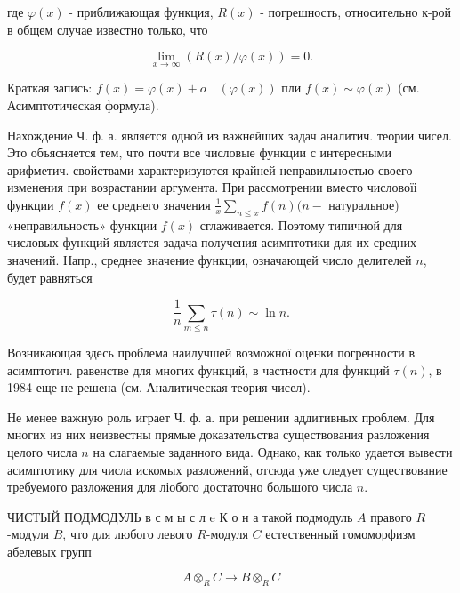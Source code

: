 \documentclass[10pt]{article}
\begin{document}
где $\varphi(x)$ - приближающая функция, $R(x)$ - погрешность, относительно к-рой в общем случае известно только, что



\[

\lim _{x \rightarrow \infty}(R(x) / \varphi(x))=0 .

\]



Краткая запись: $f(x)=\varphi(x)+o \quad(\varphi(x))$ пли $f(x) \sim \varphi(x)$ (см. Асимптотическая формула).



Нахождение Ч. ф. а. является одной из важнейших задач аналитич. теории чисел. Это объясняется тем, что почти все числовые функции с интересными арифметич. свойствами характеризуются крайней неправильностью своего изменения при возрастании аргумента. При рассмотрении вместо числовоїі функции $f(x)$ ее среднего значения $\frac{1}{x} \sum_{n \leqslant x} f(n)(n-$ натуральное) «неправильность» функции $f(x)$ сглаживается. Поэтому типичной для числовых функций является задача получения асимптотики для их средних значений. Напр., среднее значение функции, означающей число делителей $n$, будет равняться



\[

\frac{1}{n} \sum_{m \leqslant n} \tau(n) \sim \ln n .

\]



Возникающая здесь проблема наилучшей возможної оценки погренности в асимптотич. равенстве для многих функций, в частности для функций $\tau(n)$, в 1984 еще не решена (см. Аналитическая теория чисел).



Не менее важную роль играет Ч. ф. а. при решении аддитивных проблем. Для многих из них неизвестны прямые доказательства существования разложения целого числа $n$ на слагаемые заданного вида. Однако, как только удается вывести асимптотику для числа искомых разложений, отсюда уже следует существование требуемого разложения для ліобого достаточно большого числа $n$.



ЧИСТЫЙ ПОДМОДУЛЬ в с м ы с л $\mathrm{e}$ К о н а такой подмодуль $A$ правого $R$-модуля $B$, что для любого левого $R$-модуля $C$ естественный гомоморфизм абелевых групп



\[

A \otimes_{R} C \rightarrow B \otimes_{R} C

\]
\end{document}
